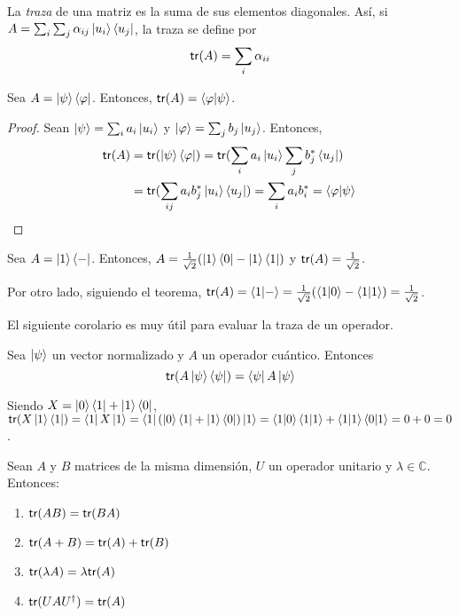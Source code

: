 \begin{definicion}[Traza]
  La \emph{traza} de una matriz es la suma de sus elementos
  diagonales.  Así, si
  $A=\sum_i\sum_j\alpha_{ij}\ket{u_i}\bra{u_j}$, la traza se
  define por
  \[
    \mathsf{tr}(A)=\sum_i\alpha_{ii}
  \]
\end{definicion}
\begin{teorema}\label{thm}
  Sea $A=\ket\psi\bra\varphi$. Entonces,
  $\mathsf{tr}(A)=\braket{\varphi|\psi}$.
\end{teorema}
\begin{proof}
  Sean $\ket\psi=\sum_ia_i\ket{u_i}$ y $\ket\varphi=\sum_jb_j\ket{u_j}$.
  Entonces,
  \begin{align}
    \mathsf{tr}(A) &=\mathsf{tr}(\ket\psi\bra\varphi)
    =\mathsf{tr}(\sum_ia_i\ket{u_i}\sum_jb_j^*\bra{u_j})\\
    &=\mathsf{tr}(\sum_{ij}a_ib_j^*\ket{u_i}\bra{u_j}) =\sum_ia_ib_i^*
    =\braket{\varphi|\psi} \qedhere
  \end {align}
\end{proof}
\begin{ejemplo}
  Sea $A=\ket 1\bra -$. Entonces, $A=\frac 1{\sqrt 2}(\ket 1\bra 0-\ket 1\bra 1)$ y
    $\mathsf{tr}(A)=\frac1{\sqrt 2}$.

    Por otro lado, siguiendo el teorema, \(\mathsf{tr}(A)=\braket{1|-}=\frac
    1{\sqrt 2}(\braket{1|0}-\braket{1|1})=\frac 1{\sqrt 2}\).
\end{ejemplo}
El siguiente corolario es muy útil para evaluar la traza de un operador.
\begin{corolario}
  \label{cor:TraceOperator}
  Sea $\ket\psi$ un vector normalizado y $A$ un operador
  cuántico. Entonces
  \[
    \mathsf{tr}(A\ket\psi\bra\psi) = \bra\psi A\ket\psi
  \]
\end{corolario}
\begin{ejemplo} Siendo $X=\ket{0}\bra{1}+\ket{1}\bra{0}$,  
  \(\mathsf{tr}(X\ket 1\bra 1)=\bra 1 X\ket 1= \bra 1 (\ket{0}\bra{1}+\ket{1}\bra{0})\ket 1 = \braket{1|0}\braket{1|1} + \braket{1|1}\braket{0|1}
  =0 + 0 = 0 \).
\end{ejemplo}
\begin{propiedades}
  Sean $A$ y $B$ matrices de la misma dimensión, $U$ un operador unitario y
  $\lambda\in\mathbb C$. Entonces:
  \begin{multicols}{2}
    \begin{enumerate}
    \item\label{prop:ciclico} $\mathsf{tr}(AB)=\mathsf{tr}(BA)$
    \item $\mathsf{tr}(A+B)=\mathsf{tr}(A)+\mathsf{tr}(B)$
    \item $\mathsf{tr}(\lambda A)=\lambda\mathsf{tr}(A)$
    \item\label{prop:simTrans} $\mathsf{tr}(UAU^\dagger) = \mathsf{tr}(A)$
    \end{enumerate}
  \end{multicols}
\end{propiedades}



